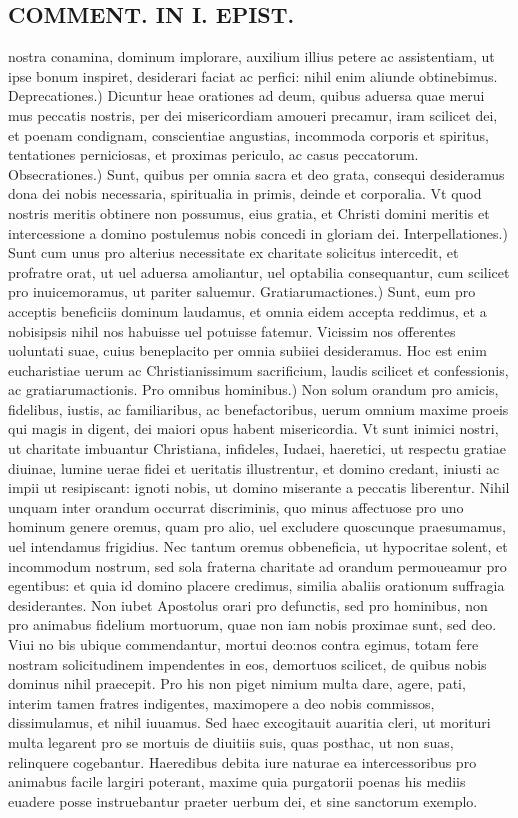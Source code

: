 \documentclass{article}
\begin{document}
\begin{pages}
\section*{COMMENT. IN I. EPIST. }
\marginpar{[ p.480 ]}\pstart nostra conamina, dominum implorare, auxilium illius petere ac assistentiam, ut ipse bonum inspiret, desiderari faciat ac perfici: nihil enim aliunde obtinebimus.  \pend\pstart Deprecationes.) Dicuntur heae orationes ad deum, quibus aduersa quae merui mus peccatis nostris, per dei misericordiam amoueri precamur, iram scilicet dei, et poenam condignam, conscientiae angustias, incommoda corporis et spiritus, tentationes perniciosas, et proximas periculo, ac casus peccatorum. Obsecrationes.) Sunt, quibus per omnia sacra et deo grata, consequi desideramus dona dei nobis necessaria, spiritualia in primis, deinde et corporalia. Vt quod nostris meritis obtinere non possumus, eius gratia, et Christi domini meritis et intercessione a domino postulemus nobis concedi in gloriam dei. Interpellationes.) Sunt cum unus pro alterius necessitate ex charitate solicitus intercedit, et profratre orat, ut uel aduersa amoliantur, uel optabilia consequantur, cum scilicet pro inuicemoramus, ut pariter saluemur. Gratiarumactiones.) Sunt, eum pro acceptis beneficiis dominum laudamus, et omnia eidem accepta reddimus, et a nobisipsis nihil nos habuisse uel potuisse fatemur. Vicissim nos offerentes uoluntati suae, cuius beneplacito per omnia subiiei desideramus. Hoc est enim eucharistiae uerum ac Christianissimum sacrificium, laudis scilicet et confessionis, ac gratiarumactionis. Pro omnibus hominibus.) Non solum orandum pro amicis, fidelibus, iustis, ac familiaribus, ac benefactoribus, uerum omnium maxime proeis qui magis in digent, dei maiori opus habent misericordia. Vt sunt inimici nostri, ut charitate imbuantur Christiana, infideles, Iudaei, haeretici, ut respectu gratiae diuinae, lumine uerae fidei et ueritatis illustrentur, et domino credant, iniusti ac impii ut resipiscant: ignoti nobis, ut domino miserante a peccatis liberentur. Nihil unquam inter orandum occurrat discriminis, quo minus affectuose pro uno hominum genere oremus, quam pro alio, uel excludere quoscunque  praesumamus, uel intendamus frigidius. Nec tantum oremus obbeneficia, ut hypocritae solent, et incommodum nostrum, sed sola fraterna charitate ad orandum permoueamur pro egentibus: et quia id domino placere credimus, similia abaliis orationum suffragia desiderantes. Non iubet Apostolus orari pro defunctis, sed pro hominibus, non pro animabus fidelium mortuorum, quae non iam nobis proximae sunt, sed deo. Viui no bis ubique  commendantur, mortui deo:nos contra egimus, totam fere nostram solicitudinem impendentes in eos, demortuos scilicet, de quibus nobis dominus nihil praecepit. Pro his non piget nimium multa dare, agere, pati, interim tamen fratres indigentes, maximopere a deo nobis commissos, dissimulamus, et nihil iuuamus. Sed haec excogitauit auaritia cleri, ut morituri multa legarent pro se mortuis de diuitiis suis, quas posthac, ut non suas, relinquere cogebantur. Haeredibus debita iure naturae ea intercessoribus pro animabus facile largiri poterant, maxime quia purgatorii poenas his mediis euadere posse instruebantur praeter uerbum dei, et sine sanctorum exemplo.  \pend

\end{pages}
\end{document}
